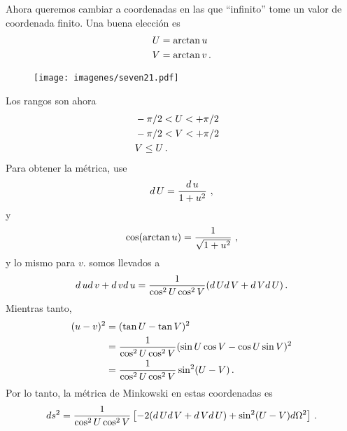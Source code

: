 \documentclass[11pt,b5paper,openany,twoside]{book}
\begin{document}
Ahora queremos cambiar a coordenadas en las que ``infinito'' tome un valor de coordenada finito.
Una buena elección es
\begin{align}
U  &=  \arctan u \notag \\  V  &=  \arctan v\,.\label{7.91}
\end{align}

\begin{figure}[ht]
\centering
\texttt{[image: imagenes/seven21.pdf]}
\end{figure}

\noindent
Los rangos son ahora
\begin{align}
&-\pi/2 < U < +\pi/2& \notag \\  &-\pi/2 < V < +\pi/2& \notag \\
& V \leq U\,.& \label{7.92}
\end{align}
Para obtener la métrica, use
\begin{equation}
 d\,U = {{ d\,u}\over{1+u^2}}\ ,%
\label{7.93}
\end{equation}
y
\begin{equation}
\cos(\arctan{u}) = {{1}\over{\sqrt{1+u^2}}}\ ,\label{7.94}
\end{equation}
y lo mismo para $v$.
somos llevados a
\begin{equation}
 d\,u d\,v +  d\,v d\,u = {{1}\over{\cos^2U \cos^2V}}
( d\,U d\,V +  d\,V d\,U)\,.\label{7.95}
\end{equation}
Mientras tanto,
\begin{align}
(u-v)^2  &=  (\tan U - \tan V)^2 \notag \\
&=  {{1}\over{\cos^2U \cos^2V}}(\sin U\cos V- \cos U \sin V)^2 \notag \\
&=  {{1}\over{\cos^2U \cos^2V}}\sin^2(U-V)\,.\label{7.96}
\end{align}
Por lo tanto, la métrica de Minkowski en estas coordenadas es
\begin{equation}
ds^2 = {{1}\over{\cos^2U \cos^2V}}\left[ -2( d\,U d\,V +  d\,V d\,U)
+\sin^2(U-V)d\Omega^2\right]\,.\label{7.97}
\end{equation}
\end{document}
